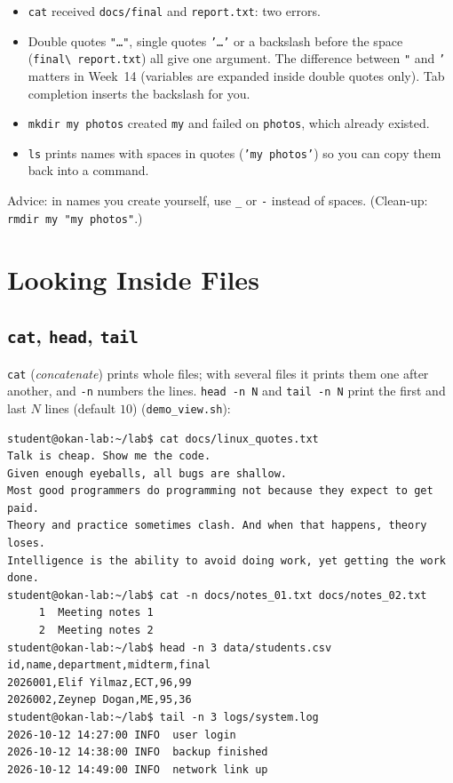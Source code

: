 \documentclass[11pt,a4paper]{article}
\newcommand{\cmd}[1]{\texttt{#1}}
\begin{document}
\begin{itemize}
  \item \cmd{cat} received \texttt{docs/final} and \texttt{report.txt}: two errors.
  \item Double quotes \texttt{"\dots"}, single quotes \texttt{'\dots'} or a backslash before the space (\texttt{final\textbackslash\ report.txt}) all give one argument. The difference between \texttt{"} and \texttt{'} matters in Week~14 (variables are expanded inside double quotes only). Tab completion inserts the backslash for you.
  \item \cmd{mkdir my photos} created \texttt{my} and failed on \texttt{photos}, which already existed.
  \item \cmd{ls} prints names with spaces in quotes (\texttt{'my photos'}) so you can copy them back into a command.
\end{itemize}
Advice: in names you create yourself, use \texttt{\_} or \texttt{-} instead of spaces. (Clean-up: \cmd{rmdir my "my photos"}.)

\section{Looking Inside Files}

\subsection{\texttt{cat}, \texttt{head}, \texttt{tail}}

\cmd{cat} (\emph{concatenate}) prints whole files; with several files it prints them one after another, and \cmd{-n} numbers the lines. \cmd{head -n N} and \cmd{tail -n N} print the first and last $N$ lines (default $10$) (\cmd{demo\_view.sh}):

\begin{lstlisting}[style=term]
student@okan-lab:~/lab$ cat docs/linux_quotes.txt
Talk is cheap. Show me the code.
Given enough eyeballs, all bugs are shallow.
Most good programmers do programming not because they expect to get paid.
Theory and practice sometimes clash. And when that happens, theory loses.
Intelligence is the ability to avoid doing work, yet getting the work done.
student@okan-lab:~/lab$ cat -n docs/notes_01.txt docs/notes_02.txt
     1  Meeting notes 1
     2  Meeting notes 2
student@okan-lab:~/lab$ head -n 3 data/students.csv
id,name,department,midterm,final
2026001,Elif Yilmaz,ECT,96,99
2026002,Zeynep Dogan,ME,95,36
student@okan-lab:~/lab$ tail -n 3 logs/system.log
2026-10-12 14:27:00 INFO  user login
2026-10-12 14:38:00 INFO  backup finished
2026-10-12 14:49:00 INFO  network link up
\end{lstlisting}
\end{document}
